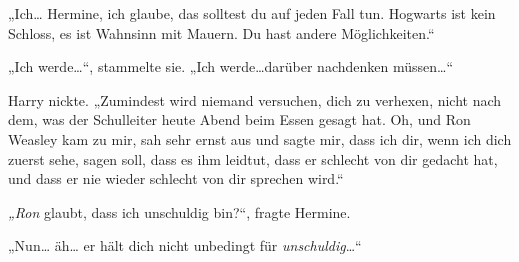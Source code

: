 „Ich… Hermine, ich glaube, das solltest du auf jeden Fall tun. Hogwarts ist kein Schloss, es ist Wahnsinn mit Mauern. Du hast andere Möglichkeiten.“

„Ich werde…“, stammelte sie. „Ich werde…darüber nachdenken müssen…“

Harry nickte. „Zumindest wird niemand versuchen, dich zu verhexen, nicht nach dem, was der Schulleiter heute Abend beim Essen gesagt hat. Oh, und Ron Weasley kam zu mir, sah sehr ernst aus und sagte mir, dass ich dir, wenn ich dich zuerst sehe, sagen soll, dass es ihm leidtut, dass er schlecht von dir gedacht hat, und dass er nie wieder schlecht von dir sprechen wird.“

\emph{„Ron} glaubt, dass ich unschuldig bin?“, fragte Hermine.

„Nun… äh… er hält dich nicht unbedingt für \emph{unschuldig}…“

\later









